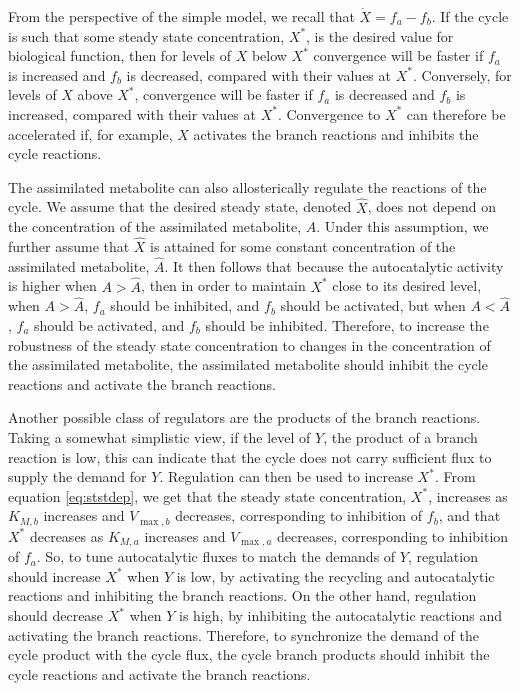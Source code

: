     From the perspective of the simple model, we recall that $\dot{X}=f_a-f_b$.
    If the cycle is such that some steady state concentration, $X^*$, is the desired value for biological function, then for levels of $X$ below $X^*$ convergence will be faster if $f_a$ is increased and $f_b$ is decreased, compared with their values at $X^*$.
    Conversely, for levels of $X$ above $X^*$, convergence will be faster if $f_a$ is decreased and $f_b$ is increased, compared with their values at $X^*$.
    Convergence to $X^*$ can therefore be accelerated if, for example, $X$ activates the branch reactions and inhibits the cycle reactions.

    The assimilated metabolite can also allosterically regulate the reactions of the cycle.
    We assume that the desired steady state, denoted $\hat{X}$, does not depend on the concentration of the assimilated metabolite, $A$.
    Under this assumption, we further assume that $\hat{X}$ is attained for some constant concentration of the assimilated metabolite, $\hat{A}$.
    It then follows that because the autocatalytic activity is higher when $A>\hat{A}$, then in order to maintain $X^*$ close to its desired level, when $A>\hat{A}$, $f_a$ should be inhibited, and $f_b$ should be activated, but when $A<\hat{A}$, $f_a$ should be activated, and $f_b$ should be inhibited.
    Therefore, to increase the robustness of the steady state concentration to changes in the concentration of the assimilated metabolite, the assimilated metabolite should inhibit the cycle reactions and activate the branch reactions.

    Another possible class of regulators are the products of the branch reactions.
    Taking a somewhat simplistic view, if the level of $Y$, the product of a branch reaction is low, this can indicate that the cycle does not carry sufficient flux to supply the demand for $Y$.
    Regulation can then be used to increase $X^*$.
    From equation \ref{eq:ststdep}, we get that the steady state concentration, $X^*$, increases as $K_{M,b}$ increases and $V_{\max,b}$ decreases, corresponding to inhibition of $f_b$, and that $X^*$ decreases as $K_{M,a}$ increases and $V_{\max,a}$ decreases, corresponding to inhibition of $f_a$.
    So, to tune autocatalytic fluxes to match the demands of $Y$, regulation should increase $X^*$ when $Y$ is low, by activating the recycling and autocatalytic reactions and inhibiting the branch reactions.
    On the other hand, regulation should decrease $X^*$ when $Y$ is high, by inhibiting the autocatalytic reactions and activating the branch reactions.
    Therefore, to synchronize the demand of the cycle product with the cycle flux, the cycle branch products should inhibit the cycle reactions and activate the branch reactions.

